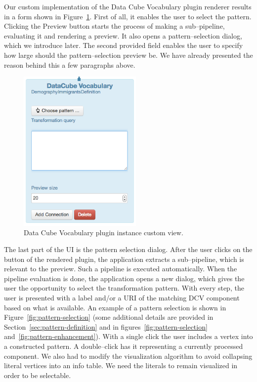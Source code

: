 Our custom implementation of the Data Cube Vocabulary plugin renderer results 
in a form shown in Figure~\ref{fig:DCV-plugin-view}. First of all, it 
enables the user to select the pattern. Clicking the Preview button starts the process of making a
sub--pipeline, evaluating it and rendering a preview. It also opens a pattern--selection
dialog, which we introduce later. The second provided field enables the user to specify how large should 
the pattern--selection preview be. We have already presented the reason behind this 
a few paragraphs above.

\begin{figure}
	\centering
	\includegraphics[width=60mm]{img/custom-dcv-piv.png}
	\caption{Data Cube Vocabulary plugin instance custom view.}
	\label{fig:DCV-plugin-view}
\end{figure}

The last part of the UI is the pattern selection dialog. After the user clicks 
on the button of the rendered plugin, the application extracts a sub--pipeline, 
which is relevant to the preview. Such a pipeline is executed
automatically. When the pipeline evaluation is done, the application opens a new 
dialog, which gives the user the opportunity to select the transformation 
pattern. With every step, the user is presented with a label and/or a URI of the 
matching DCV component based on what is available. An example of a pattern 
selection is shown in Figure~\ref{fig:pattern-selection} (some additional details are provided
in Section~\ref{sec:pattern-definition}
and in figures~\ref{fig:pattern-selection} and~\ref{fig:pattern-enhancement}).
With a single click 
the user includes a vertex into a constructed pattern. A double--click 
has it representing a currently processed component. We also had to modify the 
visualization algorithm to avoid collapsing literal vertices into an info table. 
We need the literals to remain visualized in order to be selectable.

